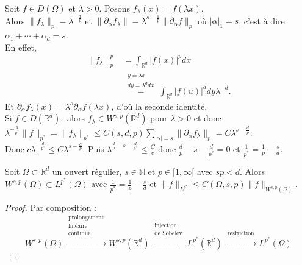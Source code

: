 \begin{remarque}
    Soit $f\in D(\Omega)$ et $\lambda>0.$ Posons $f_\lambda(x)=f(\lambda x).$\\
    Alors $\|f_\lambda\|_p=\lambda^{-\frac{d}{p}}$ et $\|\partial _\alpha f_\lambda\|=\lambda^{s-\frac{d}{p}}\|\partial_\alpha  f\|_p $ où $|\alpha | _1=s$, c'est à dire $\alpha _1+\cdots+\alpha _d=s$.\\
    En effet,
    \begin{align*}
        \|f_\lambda\|^p_p &= \int_{\mathbb{R} ^d}|f(x)| ^pdx\\
                          &\overset{\substack{y=\lambda x\\dy=\lambda^ddx}}{=} \int_{\mathbb{R} ^d}|f(u)| ^ddy\lambda^{-d}.
    \end{align*}
    Et $\partial_\alpha f_\lambda(x)=\lambda^s \partial_\alpha f(\lambda x)$, d'où la seconde identité.\\
    Si $f\in D(\mathbb{R} ^d),$ alors $f_\lambda\in W^{s,p}(\mathbb{R} ^d)$ pour $\lambda>0$ et donc $\lambda^{-\frac{d}{p^*}}\|f\|_{p^*}=\|f_\lambda\|_{p^*}\le C(s,d,p)\sum\limits_{|\alpha | =s}^{} \|\partial_\alpha  f_\lambda\|_p=C\lambda^{s-\frac{d}{p}}$.\\
Donc $c\lambda^{-\frac{d}{p^*}}\le C\lambda^{s-\frac{d}{p}}$. Puis $\lambda ^{\frac{d}{p}-s-\frac{d}{p^*}}\le \frac{C}{c}$ donc $\frac{d}{p}-s-\frac{d}{p^*}=0$ et $\frac{1}{p^*}=\frac{1}{p}-\frac{s}{d}.$
\end{remarque}
\begin{theoreme}
    Soit $\Omega\subset \mathbb{R} ^d$ un ouvert régulier, $s\in \mathbb{N} $ et $p\in [1,\infty [$ avec $sp<d.$ Alors $W^{s,p}(\Omega)\subset L^{p^*}(\Omega)$ avec $\frac{1}{p^*}=\frac{1}{p}-\frac{s}{d}$ et $\|f\|_{L^{p^*}}\le C(\Omega,s,p)\|f\|_{W^{s,p}(\Omega)}.$
\end{theoreme}
\begin{proof}
    Par composition :$$W^{s,p}(\Omega)\overset{\substack{\text{prolongement}\\\text{linéaire}\\\text{continue}\\\text{}}}{\longrightarrow}W^{s,p}(\mathbb{R} ^d)\overset{\substack{\text{injection}\\\text{de Sobelev}\\\text{}}}{\longrightarrow} L^{p^*}(\mathbb{R} ^d)\overset{\substack{\text{restriction}\\\text{}}}{\longrightarrow}L^{p^*}(\Omega)$$
\end{proof}

